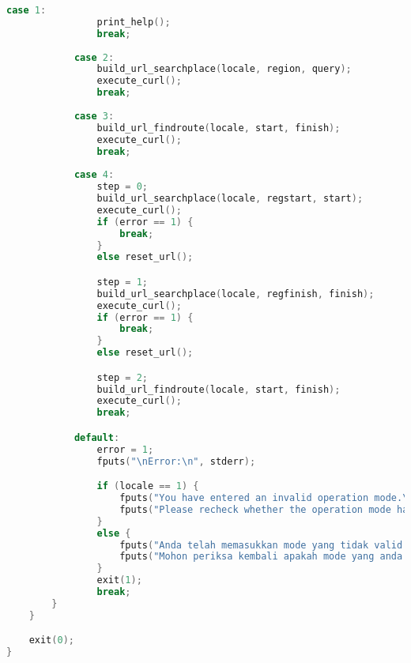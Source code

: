 \begin{lstlisting}[label={appdx:A-main}, language=C, caption=Fungsi utama perkakas (\texttt{main})]
            case 1:
                print_help();
                break;
            
            case 2:
                build_url_searchplace(locale, region, query);
                execute_curl();
                break;
            
            case 3:
                build_url_findroute(locale, start, finish);
                execute_curl();
                break;
            
            case 4:
                step = 0;
                build_url_searchplace(locale, regstart, start);
                execute_curl();
                if (error == 1) {
                    break;
                }
                else reset_url();

                step = 1;
                build_url_searchplace(locale, regfinish, finish);
                execute_curl();
                if (error == 1) {
                    break;
                }
                else reset_url();

                step = 2;
                build_url_findroute(locale, start, finish);
                execute_curl();
                break;

            default:
                error = 1;
                fputs("\nError:\n", stderr);

                if (locale == 1) {
                    fputs("You have entered an invalid operation mode.\n", stderr);
                    fputs("Please recheck whether the operation mode had been typed correctly.\n", stderr);
                }
                else {
                    fputs("Anda telah memasukkan mode yang tidak valid.\n", stderr);
                    fputs("Mohon periksa kembali apakah mode yang anda masukkan sudah diketik dengan benar.\n", stderr);
                }
                exit(1);
                break;
        }
    }

    exit(0);
}
\end{lstlisting}






